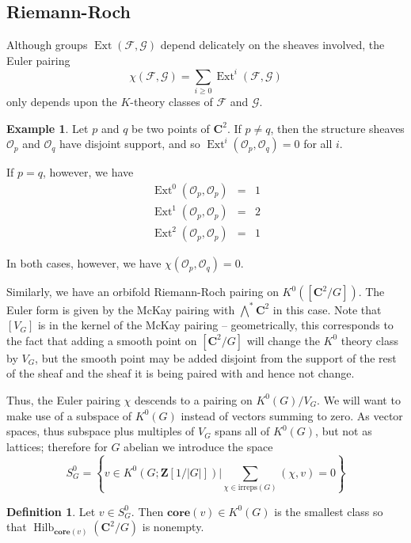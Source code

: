 \documentclass{amsart}[12pt]
\theoremstyle{definition}
\newtheorem{example}[dummy]{Example}
\newtheorem{definition}[dummy]{Definition}
\newcommand{\Z}{\mathbf{Z}}
\newcommand{\C}{\mathbf{C}}
\newcommand{\core}{\mathbf{core}}
\newcommand{\irreps}{\text{irreps}}
\DeclareMathOperator{\Hilb}{Hilb}
\DeclareMathOperator{\Ext}{Ext}
\begin{document}
\subsection{Riemann-Roch}

Although groups $\Ext(\mathcal{F},\mathcal{G})$ depend delicately on the sheaves involved, the Euler pairing
$$\chi(\mathcal{F},\mathcal{G})=\sum_{i\geq 0} \Ext^i(\mathcal{F},\mathcal{G})$$
only depends upon the $K$-theory classes of $\mathcal{F}$ and $\mathcal{G}$.

\begin{example}
Let $p$ and $q$ be two points of $\C^2$.  If $p\neq q$, then the structure sheaves $\mathcal{O}_p$ and $\mathcal{O}_q$ have disjoint support, and so $\Ext^i(\mathcal{O}_p,\mathcal{O}_q)=0$ for all $i$.

If $p=q$, however, we have 
\begin{eqnarray*}
\Ext^0(\mathcal{O}_p,\mathcal{O}_p)&=&1\\
\Ext^1(\mathcal{O}_p,\mathcal{O}_p)&=&2\\
\Ext^2(\mathcal{O}_p,\mathcal{O}_p)&=&1 
\end{eqnarray*}

In both cases, however, we have $\chi(\mathcal{O}_p,\mathcal{O}_q)=0$.
\end{example}

Similarly, we have an orbifold Riemann-Roch pairing on $K^0([\C^2/G])$.  The Euler form is given by the McKay pairing with $\bigwedge^* \C^2$ in this case.  Note that $[V_G]$ is in the kernel of the McKay pairing -- geometrically, this corresponds to the fact that adding a smooth point on $[\C^2/G]$ will change the $K^0$ theory class by $V_G$, but the smooth point may be added disjoint from the support of the rest of the sheaf and the sheaf it is being paired with and hence not change.

Thus, the Euler pairing $\chi$ descends to a pairing on $K^0(G)/V_G$.  We will want to make use of a subspace of $K^0(G)$ instead of vectors summing to zero.  As vector spaces, thus subspace plus multiples of $V_G$ spans all of $K^0(G)$, but not as lattices; therefore for $G$ abelian we introduce the space 
$$S^0_G=\left\{v\in K^0(G; \Z[1/|G|])\Bigg | \sum_{\chi\in\irreps(G)}(\chi, v)=0\right\}$$

\begin{definition}
Let $v\in S^0_G$.  Then $\core(v)\in K^0(G)$ is the smallest class so that $\Hilb_{\core(v)}(\C^2/G)$ is nonempty.
\end{definition}
\end{document}
